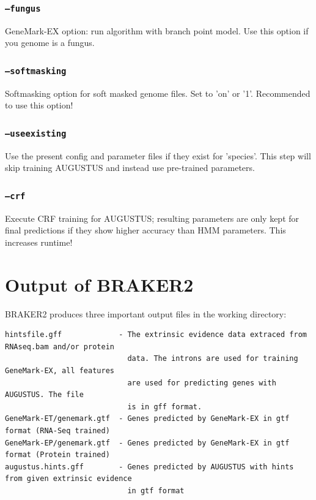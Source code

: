 \documentclass[a4paper,10pt]{report}
\begin{document}
\subsection{\texttt{--fungus}}                             GeneMark-EX option: run algorithm with branch point model. Use this option if you genome is a fungus.
    \subsection{\texttt{--softmasking}}                        Softmasking option for soft masked genome files. Set to 'on' or '1'. Recommended to use this option!
   
    \subsection{\texttt{--useexisting}}                        Use the present config and parameter files if they exist for 
                                         'species'. This step will skip training AUGUSTUS and instead use pre-trained parameters.
  
    \subsection{\texttt{--crf}}                                Execute CRF training for AUGUSTUS; resulting parameters are only kept for
                                         final predictions if they show higher accuracy than HMM parameters. This increases runtime!
              


\chapter{Output of BRAKER2}

BRAKER2 produces three important output files in the working directory:

\begin{verbatim}
hintsfile.gff             - The extrinsic evidence data extraced from RNAseq.bam and/or protein
                            data. The introns are used for training GeneMark-EX, all features
                            are used for predicting genes with AUGUSTUS. The file
                            is in gff format.
GeneMark-ET/genemark.gtf  - Genes predicted by GeneMark-EX in gtf format (RNA-Seq trained)
GeneMark-EP/genemark.gtf  - Genes predicted by GeneMark-EX in gtf format (Protein trained)
augustus.hints.gff        - Genes predicted by AUGUSTUS with hints from given extrinsic evidence
                            in gtf format

\end{verbatim}
\end{document}
